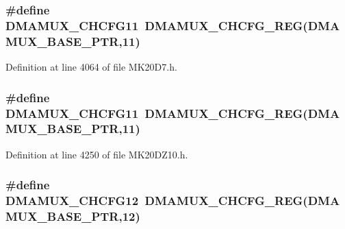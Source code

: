 \subsubsection[{\texorpdfstring{D\+M\+A\+M\+U\+X\+\_\+\+C\+H\+C\+F\+G11}{DMAMUX_CHCFG11}}]{\setlength{\rightskip}{0pt plus 5cm}\#define D\+M\+A\+M\+U\+X\+\_\+\+C\+H\+C\+F\+G11~{\bf D\+M\+A\+M\+U\+X\+\_\+\+C\+H\+C\+F\+G\+\_\+\+R\+EG}({\bf D\+M\+A\+M\+U\+X\+\_\+\+B\+A\+S\+E\+\_\+\+P\+TR},11)}\hypertarget{group___d_m_a_m_u_x___register___accessor___macros_gaa486d430500d0203481685f0485228ca}{}\label{group___d_m_a_m_u_x___register___accessor___macros_gaa486d430500d0203481685f0485228ca}


Definition at line 4064 of file M\+K20\+D7.\+h.

\subsubsection[{\texorpdfstring{D\+M\+A\+M\+U\+X\+\_\+\+C\+H\+C\+F\+G11}{DMAMUX_CHCFG11}}]{\setlength{\rightskip}{0pt plus 5cm}\#define D\+M\+A\+M\+U\+X\+\_\+\+C\+H\+C\+F\+G11~{\bf D\+M\+A\+M\+U\+X\+\_\+\+C\+H\+C\+F\+G\+\_\+\+R\+EG}({\bf D\+M\+A\+M\+U\+X\+\_\+\+B\+A\+S\+E\+\_\+\+P\+TR},11)}\hypertarget{group___d_m_a_m_u_x___register___accessor___macros_gaa486d430500d0203481685f0485228ca}{}\label{group___d_m_a_m_u_x___register___accessor___macros_gaa486d430500d0203481685f0485228ca}


Definition at line 4250 of file M\+K20\+D\+Z10.\+h.

\subsubsection[{\texorpdfstring{D\+M\+A\+M\+U\+X\+\_\+\+C\+H\+C\+F\+G12}{DMAMUX_CHCFG12}}]{\setlength{\rightskip}{0pt plus 5cm}\#define D\+M\+A\+M\+U\+X\+\_\+\+C\+H\+C\+F\+G12~{\bf D\+M\+A\+M\+U\+X\+\_\+\+C\+H\+C\+F\+G\+\_\+\+R\+EG}({\bf D\+M\+A\+M\+U\+X\+\_\+\+B\+A\+S\+E\+\_\+\+P\+TR},12)}\hypertarget{group___d_m_a_m_u_x___register___accessor___macros_gad85d6c943c6d1ed2d7f39925fed5b550}{}\label{group___d_m_a_m_u_x___register___accessor___macros_gad85d6c943c6d1ed2d7f39925fed5b550}


